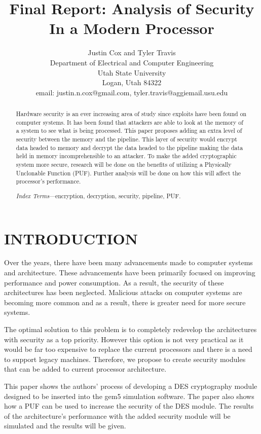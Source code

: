 \documentclass[letterpaper, 10 pt, conference]{ieeeconf}  %
\title{\LARGE \bf
Final Report: Analysis of Security In a Modern Processor
}
\author{Justin Cox and Tyler Travis
\\ \small{Department of Electrical and Computer Engineering}
\\ \small{Utah State University}
\\ \small{Logan, Utah 84322}
\\ \small{email: justin.n.cox@gmail.com, tyler.travis@aggiemail.usu.edu}
}
\begin{document}
\maketitle
\thispagestyle{empty}
\pagestyle{empty}


\begin{abstract}

Hardware security is an ever increasing area of study since exploits have been found on computer systems. It has been found that attackers are able to look at the memory of a system to see what is being processed. This paper proposes adding an extra level of security between the memory and the pipeline. This layer of security would encrypt data headed to memory and decrypt the data headed to the pipeline making the data held in memory incomprehensible to an attacker. To make the added cryptographic system more secure, research will be done on the benefits of utilizing a Physically Unclonable Function (PUF). Further analysis will be done on how this will affect the processor's performance.

\emph{Index Terms}---encryption, decryption, security, pipeline, PUF.

\end{abstract}

\section{INTRODUCTION}

Over the years, there have been many advancements made to computer systems and architecture. These advancements have been primarily focused on improving performance and power consumption. As a result, the security of these architectures has been neglected. Malicious attacks on computer systems are becoming more common and as a result, there is greater need for more secure systems.

The optimal solution to this problem is to completely redevelop the architectures with security as a top priority. However this option is not very practical as it would be far too expensive to replace the current processors and there is a need to support legacy machines. Therefore, we propose to create security modules that can be added to current processor architecture.

This paper shows the authors' process of developing a DES cryptography module designed to be inserted into the gem5 simulation software.  The paper also shows how a PUF can be used to increase the security of the DES module.  The results of the architecture's performance with the added security module will be simulated and the results will be given. 
\end{document}
